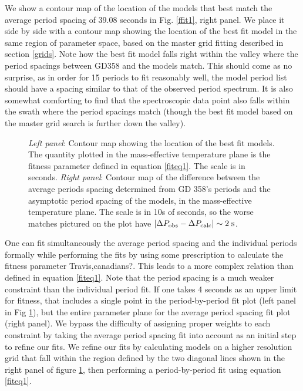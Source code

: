 \documentclass[12pt,preprint]{aastex}
\begin{document}
We show a contour map of the location of the models that best match the average period spacing of 
39.08 seconds in Fig. \ref{ffit1}, right panel. We place it side by side with a contour map showing 
the location of the best fit model in the same region of parameter space, based on the master grid 
fitting described in section \ref{grids}. Note how the best fit model falls right within the valley 
where the period spacings between GD358 and the models match. This should come as no surprise, as in 
order for 15 periods to fit reasonably well, the model period list should have a spacing similar to 
that of the observed period spectrum. It is also somewhat comforting to find that the spectroscopic 
data point also falls within the swath where the period spacings match (though the best fit model 
based on the master grid search is further down the valley).

\begin{figure}
\caption{
{\it Left panel}: Contour map showing the location of the best fit models. The quantity plotted in 
the mass-effective temperature plane is the fitness parameter defined in equation \ref{fiteq1}. 
The scale is in seconds. {\it Right panel}: Contour map of the difference between the average 
periods spacing determined from GD 358's periods and the asymptotic period spacing of the models, 
in the mass-effective temperature plane. The scale is in 10s of seconds, so the worse matches 
pictured on the plot have $\left|\Delta P_{\rm obs}- \Delta P_{\rm calc}\right| \sim 2 \; \rm s$. \label{ffit2}
}
\end{figure}

One can fit simultaneously the average period spacing and the individual periods 
formally while performing the fits by using some prescription to calculate the fitness parameter 
{Travis,canadians?}. This leads to a more complex relation than defined in equation \ref{fiteq1}. 
Note that the period spacing is a much weaker constraint than the individual period fit. 
If one takes 4 seconds as an upper limit for fitness, that includes a single point in the 
period-by-period fit plot (left panel in Fig \ref{ffit2}), but the entire parameter plane 
for the average period spacing fit plot (right panel). We bypass the difficulty of 
assigning proper weights to each constraint by taking the average period spacing fit into 
account as an initial step to refine our fits. We refine our fits by calculating models on 
a higher resolution grid that fall within the region defined by the two diagonal lines shown 
in the right panel of figure \ref{ffit2}, then performing a period-by-period fit using 
equation \ref{fiteq1}.
\end{document}
